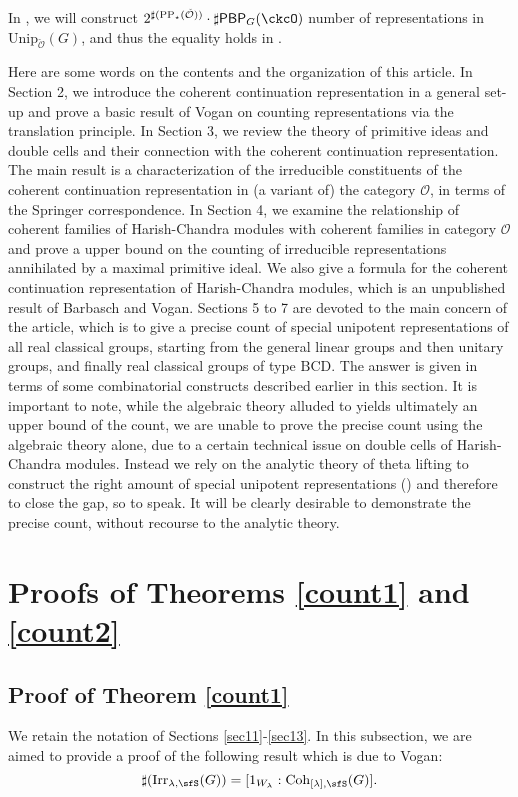 \documentclass[12pt,a4paper]{amsart}
\newcommand{\CO}{{\mathcal {O}}}
\newcommand{\be}{\begin {equation}}
\newcommand{\ee}{\end {equation}}
\numberwithin{equation}{section}
\theoremstyle{remark}
\def\Irr{\mathrm{Irr}}
\def\Unip{\mathrm{Unip}}
\def\Coh{\mathrm{Coh}}
\def\CPP{\mathrm{PP}}
\def\PBP{\mathsf{PBP}}
\begin{document}
In \cite{BMSZ2}, we will construct $2^{\sharp(\CPP_\star(\check \CO))} \cdot \sharp \PBP_{G}(\ckcO)$ number of representations in
$\Unip_{\check \CO}(G)$, and thus the equality holds in .

\medskip

Here are some words on the contents and the organization of this article. In Section 2, we introduce the coherent continuation representation in a general set-up and prove a basic result of Vogan on counting representations via the translation principle. In Section 3, we review the theory of primitive ideas and double cells and their connection with the coherent continuation representation. The main result is a characterization of the irreducible constituents of the coherent continuation representation in (a variant of) the category $\CO$, in terms of the Springer correspondence. In Section 4, we examine the relationship of coherent families of Harish-Chandra modules with coherent families in category $\CO$ and prove a upper bound on the counting of irreducible representations annihilated by a maximal primitive ideal. We also give a formula for the coherent continuation representation of Harish-Chandra modules, which is an unpublished result of Barbasch and Vogan. Sections 5 to 7 are devoted to the main concern of the article, which is to give a precise count of special unipotent representations of all real classical groups, starting from the general linear groups and then unitary groups, and finally real classical groups of type $\mathrm{BCD}$. The answer is given in terms of some combinatorial constructs described earlier in this section. It is important to note, while the algebraic theory alluded to yields ultimately an upper bound of the count, we are unable to prove the precise count using the algebraic theory alone, due to a certain technical issue on double cells of Harish-Chandra modules. Instead we rely on the analytic theory of theta lifting to construct the right amount of special unipotent representations (\cite{BMSZ2}) and therefore to close the gap, so to speak. It will be clearly desirable to demonstrate the precise count, without recourse to the analytic theory.


\section{Proofs of Theorems \ref{count1} and  \ref{count2}}


\subsection{Proof of Theorem \ref{count1}} We retain the notation of Sections \ref{sec11}-\ref{sec13}. In this subsection, we are aimed to provide a proof of the following result which is due to Vogan:
 \be\label{eqthemc1}
    \sharp(\Irr_{\lambda,\sfS}(G)) = [1_{W_{\lambda}}:\Coh_{[\lambda],\sfS}(G)].
  \ee
\end{document}
